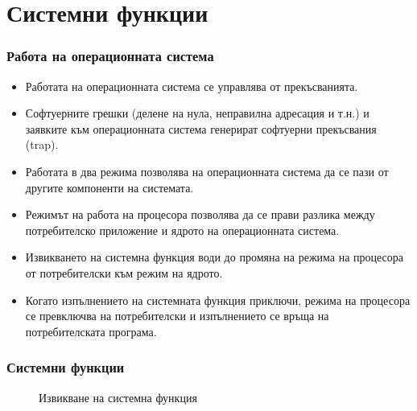 \documentclass[ignorenonframetext, hyperref=unicode]{beamer}
\begin{document}
\section{Системни функции}

\begin{frame}
\frametitle{Работа на операционната система}
\begin{itemize}
\item Работата на операционната система се управлява от прекъсванията.
\item Софтуерните грешки (делене на нула, неправилна адресация и т.н.) и
заявките към операционната система генерират софтуерни прекъсвания (trap).
\item Работата в два режима позволява на операционната система да се пази от
другите компоненти на системата.
\item Режимът на работа на процесора позволява да се прави разлика между
потребителско приложение и ядрото на операционната система.
\item Извикването на системна функция води до промяна на режима на процесора от
потребителски към режим на ядрото. 
\item Когато изпълнението на системната функция
приключи, режима на процесора се превключва на потребителски и изпълнението се
връща на потребителската
програма.
\end{itemize}
\end{frame}

\begin{frame}
\frametitle{Системни функции}
\begin{figure}[h]
\center
{}
\caption{Извикване на системна функция}
\end{figure}
\end{frame}
\end{document}
